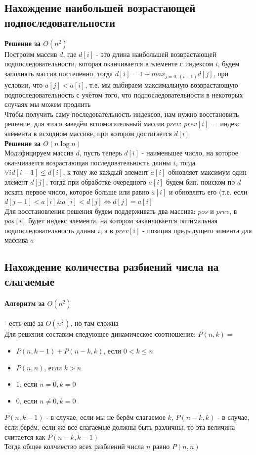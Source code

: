 \documentclass[a4paper,10pt]{article}
\begin{document}
\subsection{Нахождение наибольшей возрастающей подпоследовательности}
\textbf{Решение за $O(n^2)$} \\
Построим массив $d$, где $d[i]$ - это длина наибольшей возврастающей подпоследовательности, которая оканчивается в элементе с индексом $i$, будем заполнять массив постепенно, тогда $d[i] = 1 + max_{j=0..(i-1)} d[j]$, при условии, что $a[j] < a[i]$, т.е. мы выбираем максимальную возврастающую подпоследовательность с учётом того, что подпоследовательности в некоторых случаях мы можем продлить \\
Чтобы получить саму последовательность индексов, нам нужно восстановить решение, для этого заведём вспомогательный массив $prev$: $prev[i] = $ индекс элемента в исходном массиве, при котором достигается $d[i]$ \\
\textbf{Решение за $O(n \log n)$} \\
Модифицируем массив $d$, пусть теперь $d[i]$ - наименьшее число, на которое оканчивается возрастающая последовательность длины $i$, тогда $\forall i d[i-1] \leq d[i]$, к тому же каждый элемент $a[i]$ обновляет максимум один элемент $d[j]$, тогда при обработке очередного $a[i]$ будем бин. поиском по $d$ искать первое число, которое больше или равно $a[i]$ и обновлять его (т.е. если $d[j-1] < a[i] \& a[i] < d[j] \Leftrightarrow d[j] = a[i]$ \\
Для восстановления решения будем поддерживать два массива: $pos$ и $prev$, в $pos[i]$ будет индекс элемента, на котором заканчивается оптимальная подпоследовательность длины $i$, а в $prev[i]$ - позиция предыдущего элмента для массива $a$ \\
\subsection{Нахождение количества разбиений числа на слагаемые}
\paragraph{Алгоритм за $O(n^2)$} - есть ещё за $O(n^{\frac{3}{2}})$, но там сложна \\
Для решения составим следующее динамическое соотношение: $P(n, k) = $
\begin{itemize}
	\item $P(n, k - 1) + P(n - k, k)$, если $0 < k \leq n$
	\item $P(n, n)$, если $k>n$
	\item $1$, если $n = 0, k = 0$
	\item $0$, если $n \neq 0, k = 0$
\end{itemize}
$P(n, k - 1)$ - в случае, если мы не берём слагаемое $k$, $P(n - k, k)$ - в случае, если берём, если же все слагаемые должны быть различны, то эта величина считается как $P(n - k, k - 1)$ \\
Тогда общее колчиество всех разбиений числа $n$ равно $P(n, n)$ \\
\end{document}

